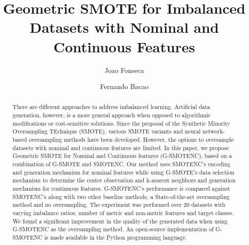 \documentclass[preprint,12pt]{elsarticle}
\begin{document}
{\setlength{\tabcolsep}{2.5pt}

\begin{frontmatter}

\title{Geometric SMOTE for Imbalanced Datasets with Nominal and Continuous Features}

\author[inst1]{Joao Fonseca}
\author[inst1]{Fernando Bacao}


\begin{abstract}

    There are different approaches to address imbalanced learning. Artificial
    data generation, however, is a more general approach when opposed to
    algorithmic modifications or cost-sensitive solutions. Since the proposal
    of the Synthetic Minority Oversampling TEchnique (SMOTE), various SMOTE
    variants and neural network-based oversampling methods have been
    developed.  However, the options to oversample datasets with nominal and
    continuous features are limited. In this paper, we propose Geometric SMOTE
    for Nominal and Continuous features (G-SMOTENC), based on a combination of
    G-SMOTE and SMOTENC. Our method uses SMOTENC's encoding and generation
    mechanism for nominal features while using G-SMOTE's data selection
    mechanism to determine the center observation and k-nearest neighbors and
    generation mechanism for continuous features. G-SMOTENC's performance is
    compared against SMOTENC's along with two other baseline methods, a
    State-of-the-art oversampling method and no oversampling. The experiment
    was performed over 20 datasets with varying imbalance ratios, number of
    metric and non-metric features and target classes. We found a significant
    improvement in the quality of the generated data when using G-SMOTENC as
    the oversampling method. An open-source implementation of G-SMOTENC is
    made available in the Python programming language.

\end{abstract}



\end{frontmatter}}
\end{document}
